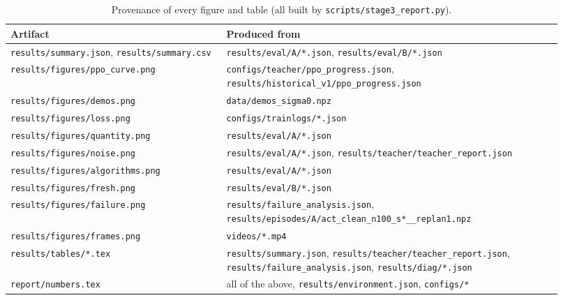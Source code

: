 \begin{table}[t]
\centering
\scriptsize
\begin{adjustbox}{max width=\linewidth}
\begin{tabular}{p{0.36\linewidth}p{0.56\linewidth}}
\toprule
Artifact & Produced from \\
\midrule
\nolinkurl{results/summary.json}, \nolinkurl{results/summary.csv} & \nolinkurl{results/eval/A/*.json}, \nolinkurl{results/eval/B/*.json} \\
\nolinkurl{results/figures/ppo_curve.png} & \nolinkurl{configs/teacher/ppo_progress.json}, \nolinkurl{results/historical_v1/ppo_progress.json} \\
\nolinkurl{results/figures/demos.png} & \nolinkurl{data/demos_sigma0.npz} \\
\nolinkurl{results/figures/loss.png} & \nolinkurl{configs/trainlogs/*.json} \\
\nolinkurl{results/figures/quantity.png} & \nolinkurl{results/eval/A/*.json} \\
\nolinkurl{results/figures/noise.png} & \nolinkurl{results/eval/A/*.json}, \nolinkurl{results/teacher/teacher_report.json} \\
\nolinkurl{results/figures/algorithms.png} & \nolinkurl{results/eval/A/*.json} \\
\nolinkurl{results/figures/fresh.png} & \nolinkurl{results/eval/B/*.json} \\
\nolinkurl{results/figures/failure.png} & \nolinkurl{results/failure_analysis.json}, \nolinkurl{results/episodes/A/act_clean_n100_s*__replan1.npz} \\
\nolinkurl{results/figures/frames.png} & \nolinkurl{videos/*.mp4} \\
\nolinkurl{results/tables/*.tex} & \nolinkurl{results/summary.json}, \nolinkurl{results/teacher/teacher_report.json}, \nolinkurl{results/failure_analysis.json}, \nolinkurl{results/diag/*.json} \\
\nolinkurl{report/numbers.tex} & all of the above, \nolinkurl{results/environment.json}, \nolinkurl{configs/*} \\
\bottomrule
\end{tabular}
\end{adjustbox}
\caption{Provenance of every figure and table (all built by \texttt{scripts/stage3\_report.py}).}
\label{tab:prov}
\end{table}
